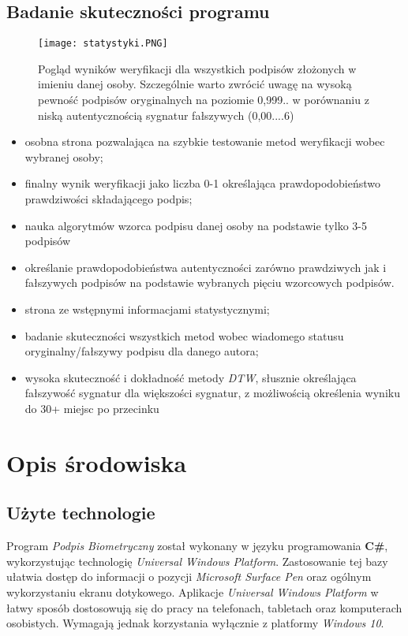 \documentclass[notitlepage, oneside]{report}
\begin{document}
 \section*{Badanie skuteczności programu}
 
  \begin{figure}
\centering
\texttt{[image: statystyki.PNG]}
\caption{Pogląd wyników weryfikacji dla wszystkich podpisów złożonych w imieniu danej osoby. Szczególnie warto zwrócić uwagę na wysoką pewność podpisów oryginalnych na poziomie 0,999.. w porównaniu z niską autentycznością sygnatur fałszywych (0,00....6)}
\label{rys:Okno weryfikacji sygnatury}
\end{figure}

\begin{itemize}
  \item osobna strona pozwalająca na szybkie testowanie metod weryfikacji wobec wybranej osoby;
  \item finalny wynik weryfikacji jako liczba 0-1 określająca prawdopodobieństwo prawdziwości składającego podpis;
  \item nauka algorytmów wzorca podpisu danej osoby na podstawie tylko 3-5 podpisów
  \item określanie prawdopodobieństwa autentyczności zarówno prawdziwych jak i fałszywych podpisów na podstawie wybranych pięciu wzorcowych podpisów.  
  \item strona ze wstępnymi informacjami statystycznymi;
  \item badanie skuteczności wszystkich metod wobec wiadomego statusu oryginalny/fałszywy podpisu dla danego autora;  
  \item wysoka skuteczność  i dokładność metody \textit{DTW}, słusznie określająca fałszywość sygnatur dla większości sygnatur, z możliwością określenia wyniku do 30+ miejsc po przecinku
 \end{itemize}

\chapter*{Opis środowiska}
\section*{Użyte technologie}
Program \textit{Podpis Biometryczny} został wykonany w języku programowania \textbf{C\#}, wykorzystując technologię \textit{Universal Windows Platform}. Zastosowanie tej bazy ułatwia dostęp do informacji o pozycji \textit{Microsoft Surface Pen} oraz ogólnym wykorzystaniu ekranu dotykowego. Aplikacje \textit{Universal Windows Platform} w łatwy sposób dostosowują się do pracy na telefonach, tabletach oraz komputerach osobistych. Wymagają jednak korzystania wyłącznie z platformy  \textit{Windows 10}.
\end{document}
